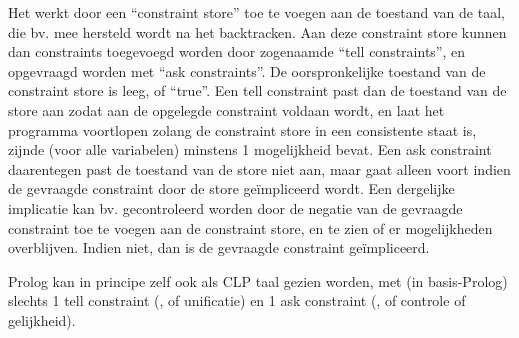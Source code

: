 Het werkt door een ``constraint store'' toe te voegen aan de toestand van de taal, die bv. mee hersteld wordt na het backtracken. Aan deze constraint store kunnen dan constraints toegevoegd worden door zogenaamde ``tell constraints'', en opgevraagd worden met ``ask constraints''. De oorspronkelijke toestand van de constraint store is leeg, of ``true''. Een tell constraint past dan de toestand van de store aan zodat aan de opgelegde constraint voldaan wordt, en laat het programma voortlopen zolang de constraint store in een consistente staat is, zijnde (voor alle variabelen) minstens 1 mogelijkheid bevat. Een ask constraint daarentegen past de toestand van de store niet aan, maar gaat alleen voort indien de gevraagde constraint door de store ge\"impliceerd wordt. Een dergelijke implicatie kan bv. gecontroleerd worden door de negatie van de gevraagde constraint toe te voegen aan de constraint store, en te zien of er mogelijkheden overblijven. Indien niet, dan is de gevraagde constraint ge\"impliceerd.

Prolog kan in principe zelf ook als CLP taal gezien worden, met (in basis-Prolog) slechts 1 tell constraint (\code{=}, of unificatie) en 1 ask constraint (\code{==}, of controle of gelijkheid).


